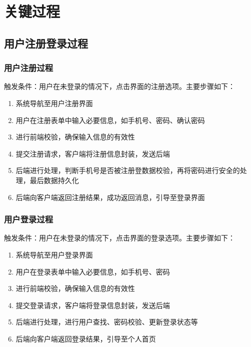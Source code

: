 \documentclass[12pt,a4paper,UTF8]{article}
\begin{document}
\section{关键过程}

\subsection{用户注册登录过程}

\subsubsection{用户注册过程}

触发条件：用户在未登录的情况下，点击界面的注册选项。主要步骤如下：

\begin{enumerate}[topsep=2pt, partopsep=0pt]
  \item 系统导航至用户注册界面
  \item 用户在注册表单中输入必要信息，如手机号、密码、确认密码
  \item 进行前端校验，确保输入信息的有效性
  \item 提交注册请求，客户端将注册信息封装，发送后端
  \item 后端进行处理，判断手机号是否被注册登数据校验，再将密码进行安全的处理，最后数据持久化
  \item 后端向客户端返回注册结果，成功返回消息，引导至登录界面
\end{enumerate}

\subsubsection{用户登录过程}

触发条件：用户在未登录的情况下，点击界面的登录选项。主要步骤如下：

\begin{enumerate}[topsep=2pt, partopsep=0pt]
  \item 系统导航至用户登录界面
  \item 用户在登录表单中输入必要信息，如手机号、密码
  \item 进行前端校验，确保输入信息的有效性
  \item 提交登录请求，客户端将登录信息封装，发送后端
  \item 后端进行处理，进行用户查找、密码校验、更新登录状态等
  \item 后端向客户端返回登录结果，引导至个人首页
\end{enumerate}
\end{document}

